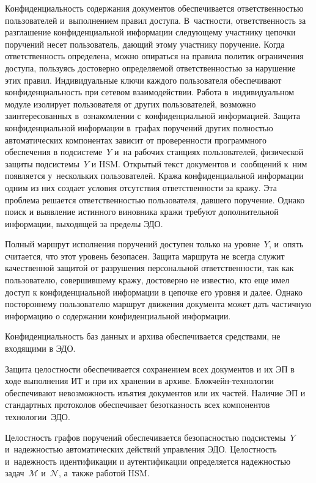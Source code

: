 \begin{multicols}{2}
  \vspace*{-2pt}
  
  Конфиденциальность содержания документов обеспечивается 
ответственностью пользователей и~выполнением правил доступа. В~частности, 
ответственность за разглашение конфиденциальной информации сле\-ду\-юще\-му 
участнику цепочки поручений несет пользователь, дающий этому участнику 
поручение. Когда ответственность определена, можно опираться на правила 
политик ограничения доступа, пользуясь достоверно опре\-де\-ля\-емой 
ответственностью за нарушение этих правил. Индивидуальные ключи каждого 
пользователя обеспечивают конфиденциальность при сетевом взаимодействии. 
Работа в~индивидуальном модуле изолирует пользователя от других 
пользователей, возможно заинтересованных в~ознакомлении с~конфиденциальной 
информацией. Защита конфиденциальной информации в~графах поручений 
других полностью автоматических компонентах зависит от проверенности 
программного обеспечения в подсистеме~$Y$ и~на рабочих станциях 
пользователей, физической защиты подсистемы~$Y$ и HSM. Открытый текст 
документов и~сообщений к~ним появляется у~нескольких пользователей. Кража 
конфиденциальной информации одним из них создает условия отсутствия 
ответственности за кражу. Эта проб\-ле\-ма решается ответственностью 
пользователя, давшего поручение. Однако поиск и выявление истинного 
виновника кражи требуют дополнительной информации, выходящей за пределы 
ЭДО. 
  
  Полный маршрут исполнения поручений доступен только на уровне~$Y$, 
и~опять считается, что этот уровень безопасен. Защита маршрута не всегда 
служит качественной защитой от разрушения персональной ответственности, так 
как пользователю, совершившему кражу, достоверно не известно, кто еще имел 
доступ к конфиденциальной информации в цепочке его уровня и далее. Однако 
постороннему пользователю маршрут движения документа может дать частичную 
информацию о содержании конфиденциальной информации.
  
  Конфиденциальность баз данных и архива обеспечивается средствами, не 
входящими в ЭДО.
  
  Защита целостности обеспечивается сохранением всех документов и их ЭП в 
ходе выполнения ИТ и при их хранении в архиве. Блокчейн-технологии 
обеспечивают невозможность изъятия документов или их частей. Наличие ЭП и 
стандартных протоколов обеспечивает безотказность всех компонентов 
технологии~ЭДО.
  
  Целостность графов поручений обеспечивается безопасностью подсистемы~$Y$ и~надежностью автоматических действий управления ЭДО. 
  Целостность и~надежность идентификации и аутентификации определяется надежностью 
задач~$\mathcal{M}$ и~$\mathcal{N}$, а~также работой HSM.
  

\end{multicols}
